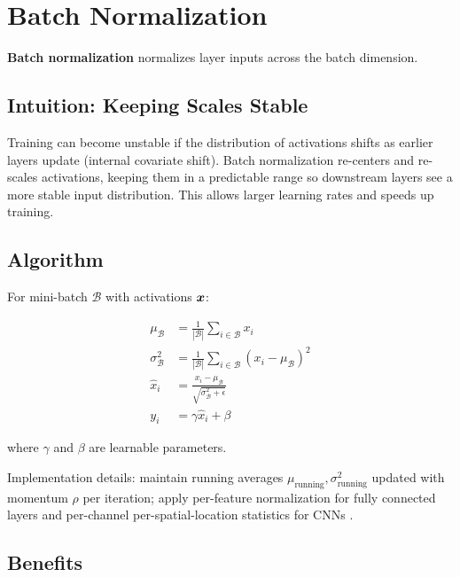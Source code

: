 
\section{Batch Normalization}
\label{sec:batch-normalization}

\textbf{Batch normalization} normalizes layer inputs across the batch dimension.

\subsection{Intuition: Keeping Scales Stable}

Training can become unstable if the distribution of activations shifts as earlier layers update (internal covariate shift). Batch normalization re-centers and re-scales activations, keeping them in a predictable range so downstream layers see a more stable input distribution. This allows larger learning rates and speeds up training.

\subsection{Algorithm}

For mini-batch $\mathcal{B}$ with activations $\boldsymbol{x}$:

\begin{align}
\mu_{\mathcal{B}} &= \frac{1}{|\mathcal{B}|} \sum_{i \in \mathcal{B}} x_i \\
\sigma^2_{\mathcal{B}} &= \frac{1}{|\mathcal{B}|} \sum_{i \in \mathcal{B}} (x_i - \mu_{\mathcal{B}})^2 \\
\hat{x}_i &= \frac{x_i - \mu_{\mathcal{B}}}{\sqrt{\sigma^2_{\mathcal{B}} + \epsilon}} \\
y_i &= \gamma \hat{x}_i + \beta
\end{align}

where $\gamma$ and $\beta$ are learnable parameters.

Implementation details: maintain running averages $\mu_{\text{running}}, \sigma^2_{\text{running}}$ updated with momentum $\rho$ per iteration; apply per-feature normalization for fully connected layers and per-channel per-spatial-location statistics for CNNs \cite{Ioffe2015,GoodfellowEtAl2016}.

\subsection{Benefits}

